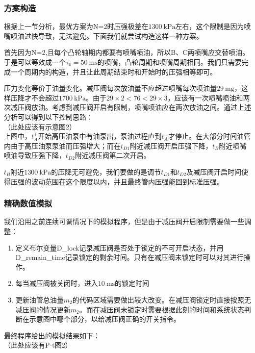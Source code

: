 \documentclass{article}
\newcommand{\pre}{~\mathrm{kPa}}
\newcommand{\tim}{~\mathrm{ms}}
\newcommand{\mas}{~\mathrm{mg}}
\begin{document}
	\subsubsection{方案构造}
		根据上一节分析，最优方案为N=2时压强极差在$1300\pre$左右，这个限制是因为喷嘴喷油过快导致，无法避免。下面我们就尝试构造这样一种方案。

		首先因为N=2,且每个凸轮轴期内都要有喷嘴喷油，所以B、C两喷嘴应交替喷油。于是可以等效成一个$\tau_0=50\tim$的喷嘴，凸轮周期和喷嘴周期相同。我们只需要完成一个周期内的构造，并且让此周期结束时和开始时的压强相等即可。
		
		压力变化等价于油量变化。减压阀每次放油量不应超过喷嘴每次喷油量$29\mas$，这样压降才不会超过$1700\pre$。由于$29\times 2<76<29\times 3$，应该有一次喷嘴喷油和两次减压阀放油。考虑到减压阀开启有限制，喷嘴喷油应在两次放油之间。通过上述分析可以得到以下控制思路：\\
		
		（此处应该有示意图2）\\
		
		上图中，$t_A^+$开始高压油泵中有油泵出，泵油过程直到$t_A^-$才停止。在大部分时间油管内由于高压油泵泵油而压强增大；而在$t_{D1}$附近减压阀开启压强下降，$t_B$附近喷嘴喷油导致压强下降，$t_{D2}$附近减压阀第二次开启。
		
		$t_B$附近$1300\pre$的压降无可避免，我们要做的是调节$t_{D1}$和$t_{D2}$及减压阀开启时间使得压强的波动范围在这个限度以内，并且最终管内压强能回到标准压强。
	
	\subsubsection{精确数值模拟}
		我们沿用之前连续可调情况下的模拟程序，但是由于减压阀开启限制需要做一些调整：
		\begin{enumerate}
			\item 
			定义布尔变量D\_lock记录减压阀是否处于锁定的不可开启状态，并用D\_remain\_time记录锁定的剩余时间。只有在减压阀未锁定时可以对其进行操作。
			\item 
			每当减压阀被关闭时，进入$10\tim$的锁定时间
			\item 
			更新油管总油量$m_2$的代码区域需要做出较大改变。在减压阀锁定时直接按照无减压阀的情况更新$m_2$。而在减压阀未锁定时需要根据此刻的时间和系统状态判断在示意图中哪个部分，以给减压阀正确的开关指令。
		\end{enumerate}
		最终程序给出的模拟结果如下：\\
		
		（此处应该有P-t图2）\\
		
\end{document}
